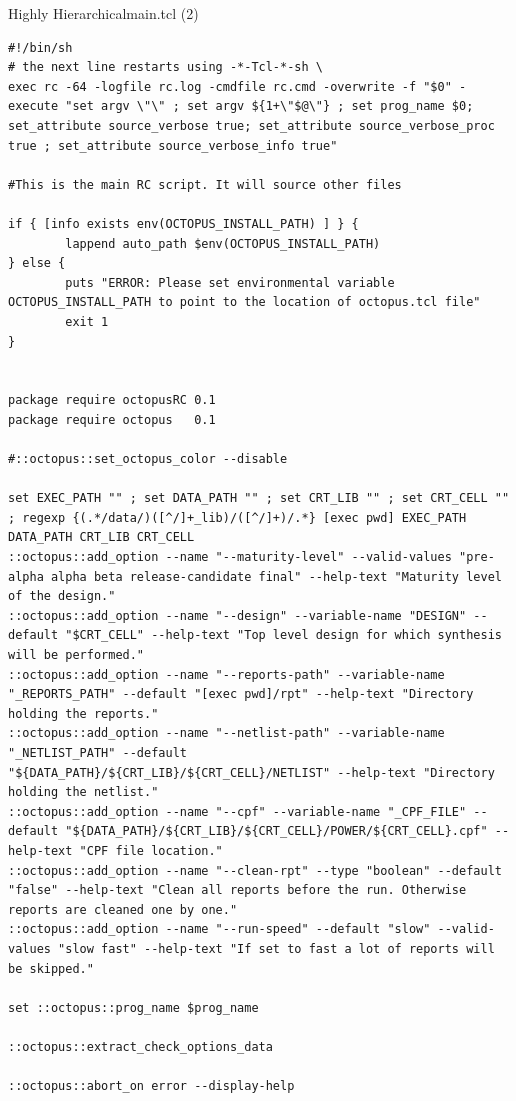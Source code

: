 \documentclass{beamer}
\begin{document}
\begin{frame}{Highly Hierarchical}{main.tcl (2)}
\tiny
\begin{verbatim}
#!/bin/sh
# the next line restarts using -*-Tcl-*-sh \
exec rc -64 -logfile rc.log -cmdfile rc.cmd -overwrite -f "$0" -execute "set argv \"\" ; set argv ${1+\"$@\"} ; set prog_name $0; set_attribute source_verbose true; set_attribute source_verbose_proc true ; set_attribute source_verbose_info true"

#This is the main RC script. It will source other files

if { [info exists env(OCTOPUS_INSTALL_PATH) ] } {
        lappend auto_path $env(OCTOPUS_INSTALL_PATH)
} else {
        puts "ERROR: Please set environmental variable OCTOPUS_INSTALL_PATH to point to the location of octopus.tcl file"
        exit 1
}


package require octopusRC 0.1
package require octopus   0.1

#::octopus::set_octopus_color --disable

set EXEC_PATH "" ; set DATA_PATH "" ; set CRT_LIB "" ; set CRT_CELL "" ; regexp {(.*/data/)([^/]+_lib)/([^/]+)/.*} [exec pwd] EXEC_PATH DATA_PATH CRT_LIB CRT_CELL
::octopus::add_option --name "--maturity-level" --valid-values "pre-alpha alpha beta release-candidate final" --help-text "Maturity level of the design."
::octopus::add_option --name "--design" --variable-name "DESIGN" --default "$CRT_CELL" --help-text "Top level design for which synthesis will be performed."
::octopus::add_option --name "--reports-path" --variable-name "_REPORTS_PATH" --default "[exec pwd]/rpt" --help-text "Directory holding the reports."
::octopus::add_option --name "--netlist-path" --variable-name "_NETLIST_PATH" --default "${DATA_PATH}/${CRT_LIB}/${CRT_CELL}/NETLIST" --help-text "Directory holding the netlist."
::octopus::add_option --name "--cpf" --variable-name "_CPF_FILE" --default "${DATA_PATH}/${CRT_LIB}/${CRT_CELL}/POWER/${CRT_CELL}.cpf" --help-text "CPF file location."
::octopus::add_option --name "--clean-rpt" --type "boolean" --default "false" --help-text "Clean all reports before the run. Otherwise reports are cleaned one by one."
::octopus::add_option --name "--run-speed" --default "slow" --valid-values "slow fast" --help-text "If set to fast a lot of reports will be skipped."

set ::octopus::prog_name $prog_name

::octopus::extract_check_options_data

::octopus::abort_on error --display-help
\end{verbatim}
\end{frame}
\end{document}
